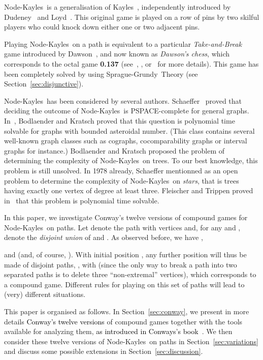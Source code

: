 \documentclass[11pt]{article}
\newcommand{\modif}[1]{\textcolor{black}{#1}}
\newcommand{\NK}{Node-Kayles}
\newcommand{\SP}{Sprague-Grundy}
\begin{document}
\NK\ is a generalisation of Kayles~\cite[Chapter~4]{WW}, independently introduced
by Dudeney~\cite{DUDENEY-10} and Loyd~\cite{LOYD-14}. 
This original game is played on a row of pins by two skilful
players who could knock down either one or two adjacent pins. 

Playing \NK\ on a path is equivalent
to a particular {\em Take-and-Break} game introduced by
Dawson~\cite{DAWSON-35}, and now known as {\em Dawson's chess}, which
corresponds to the octal game {\bf 0.137} (see~\cite[Chapter~4]{WW},
 \cite[Chapter~11]{ONAG}, or~\cite{WEB-FLAMMENKAMP} for more details).
This game has been completely solved by using \SP\ Theory (see
Section~\ref{sec:disjunctive}).

\NK\ has been considered by several authors.
Schaeffer~\cite{SCHAEFFER-78} proved that deciding the outcome of
\NK\ is PSPACE-complete for general graphs. In~\cite{BODLAENDER-KRATSCH-02},
Bodlaender and Kratsch proved that this question is polynomial time solvable
for graphs with bounded asteroidal number. (This class contains several
well-known graph classes such as cographs,
cocomparability graphs or interval graphs for instance.)
Bodlaender and Kratsch proposed the problem of determining the complexity
of \NK\ on trees. To our best knowledge, this problem is still unsolved.
In 1978 already, Schaeffer mentionned as an open problem to determine
the complexity of \NK\ on {\em stars}, that is trees having exactly one
vertex of degree at least three. Fleischer and Trippen proved
in~\cite{FLEISCHER-TRIPPEN-04}
that this problem is polynomial time solvable.

In this paper, we investigate Conway's twelve versions of compound games for
\NK\ on paths. Let  denote the path with  vertices and, for any  and ,
 denote the {\em disjoint union} of  and . As observed before, we
have ,

and 
(and, of course, ).
With initial position , any further position will thus be made of
 disjoint paths, ,
with  (since the only way to break
a path into two separated paths is to delete three ``non-extremal'' vertices),
which corresponds to a compound game.
Different rules for playing on this set of paths will lead to (very)
different situations.

This paper is organised as follows. In Section~\ref{sec:conway}, we present
in more details \modif{Conway's twelve versions} of compound games 
together with the tools
available for analyzing them,
\modif{as introduced in Conways's book~\cite[Chapter~14]{ONAG}}. 
We then consider these twelve versions 
of \NK\ on paths in Section~\ref{sec:variations} and discuss some 
possible extensions
in Section~\ref{sec:discussion}.
\end{document}
